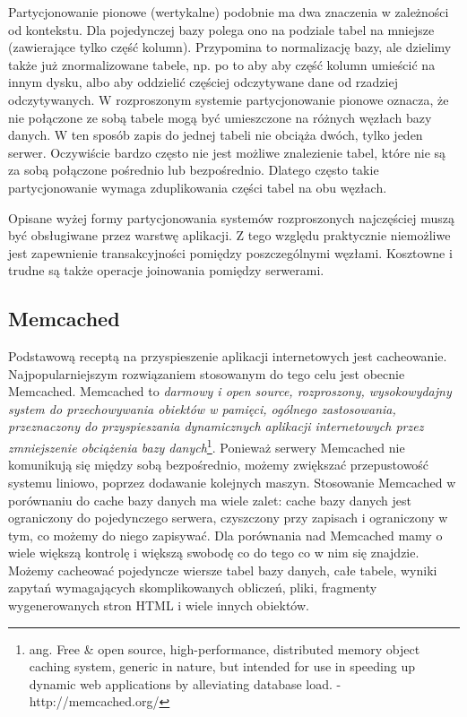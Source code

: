 
Partycjonowanie pionowe (wertykalne) podobnie ma dwa znaczenia w zależności od kontekstu.
Dla pojedynczej bazy polega ono na podziale tabel na mniejsze (zawierające tylko część kolumn).
Przypomina to normalizację bazy, ale dzielimy także już znormalizowane tabele, np. po to aby aby część kolumn umieścić na innym dysku, albo aby oddzielić częściej odczytywane dane od rzadziej odczytywanych.
W rozproszonym systemie partycjonowanie pionowe oznacza, że nie połączone ze sobą tabele mogą być umieszczone na różnych węzłach bazy danych.
W ten sposób zapis do jednej tabeli nie obciąża dwóch, tylko jeden serwer.
Oczywiście bardzo często nie jest możliwe znalezienie tabel, które nie są za sobą połączone pośrednio lub bezpośrednio.
Dlatego często takie partycjonowanie wymaga zduplikowania części tabel na obu węzłach.

Opisane wyżej formy partycjonowania systemów rozproszonych najczęściej muszą być obsługiwane przez warstwę aplikacji.
Z tego względu praktycznie niemożliwe jest zapewnienie transakcyjności pomiędzy poszczególnymi węzłami.
Kosztowne i trudne są także operacje joinowania pomiędzy serwerami.

\subsection{Memcached}

Podstawową receptą na przyspieszenie aplikacji internetowych jest cacheowanie.
Najpopularniejszym rozwiązaniem stosowanym do tego celu jest obecnie Memcached.
Memcached to \emph{darmowy i open source, rozproszony, wysokowydajny system do przechowywania obiektów w pamięci, ogólnego zastosowania, przeznaczony do przyspieszania dynamicznych aplikacji internetowych przez zmniejszenie obciążenia bazy danych}\footnote{ang. Free \& open source, high-performance, distributed memory object caching system, generic in nature, but intended for use in speeding up dynamic web applications by alleviating database load. - http://memcached.org/}.
Ponieważ serwery Memcached nie komunikują się między sobą bezpośrednio, możemy zwiększać przepustowość systemu liniowo, poprzez dodawanie kolejnych maszyn.
Stosowanie Memcached w porównaniu do cache bazy danych ma wiele zalet: cache bazy danych jest ograniczony do pojedynczego serwera, czyszczony przy zapisach i ograniczony w tym, co możemy do niego zapisywać.
Dla porównania nad Memcached mamy o wiele większą kontrolę i większą swobodę co do tego co w nim się znajdzie.
Możemy cacheować pojedyncze wiersze tabel bazy danych, całe tabele, wyniki zapytań wymagających skomplikowanych obliczeń, pliki, fragmenty wygenerowanych stron HTML i wiele innych obiektów.

